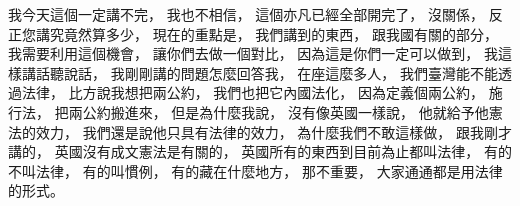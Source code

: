 \hypertarget{w06:cue:771}{}我今天這個一定講不完，
\hypertarget{w06:cue:772}{}我也不相信，
\hypertarget{w06:cue:773}{}這個亦凡已經全部開完了，
\hypertarget{w06:cue:774}{}沒關係，
\hypertarget{w06:cue:775}{}反正您講究竟然算多少，
\hypertarget{w06:cue:776}{}現在的重點是，
\hypertarget{w06:cue:777}{}我們講到的東西，
\hypertarget{w06:cue:778}{}跟我國有關的部分，
\hypertarget{w06:cue:779}{}我需要利用這個機會，
\hypertarget{w06:cue:780}{}讓你們去做一個對比，
\hypertarget{w06:cue:781}{}因為這是你們一定可以做到，
\hypertarget{w06:cue:782}{}我這樣講話聽說話，
\hypertarget{w06:cue:783}{}我剛剛講的問題怎麼回答我，
\hypertarget{w06:cue:784}{}在座這麼多人，
\hypertarget{w06:cue:785}{}我們臺灣能不能透過法律，
\hypertarget{w06:cue:786}{}比方說我想把兩公約，
\hypertarget{w06:cue:787}{}我們也把它內國法化，
\hypertarget{w06:cue:788}{}因為定義個兩公約，
\hypertarget{w06:cue:789}{}施行法，
\hypertarget{w06:cue:790}{}把兩公約搬進來，
\hypertarget{w06:cue:791}{}但是為什麼我說，
\hypertarget{w06:cue:792}{}沒有像英國一樣說，
\hypertarget{w06:cue:793}{}他就給予他憲法的效力，
\hypertarget{w06:cue:794}{}我們還是說他只具有法律的效力，
\hypertarget{w06:cue:795}{}為什麼我們不敢這樣做，
\hypertarget{w06:cue:796}{}跟我剛才講的，
\hypertarget{w06:cue:797}{}英國沒有成文憲法是有關的，
\hypertarget{w06:cue:798}{}英國所有的東西到目前為止都叫法律，
\hypertarget{w06:cue:799}{}有的不叫法律，
\hypertarget{w06:cue:800}{}有的叫慣例，
\hypertarget{w06:cue:801}{}有的藏在什麼地方，
\hypertarget{w06:cue:802}{}那不重要，
\hypertarget{w06:cue:803}{}大家通通都是用法律的形式。

